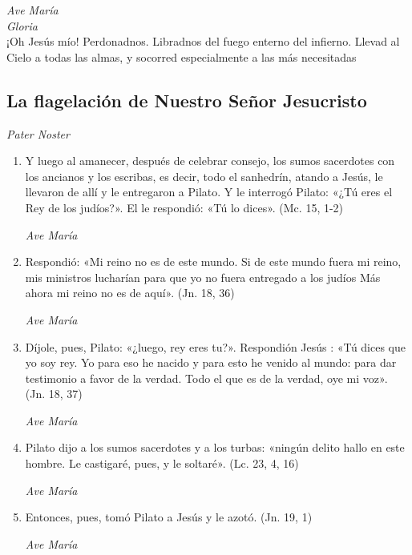 \documentclass[a4paper,11pt, oneside]{report}
\begin{document}
      \textit{Ave María} \\
      \indent\textit{Gloria} \\
      \indent¡Oh Jesús mío! Perdonadnos. Libradnos del fuego enterno del infierno. Llevad al Cielo a todas las almas, y socorred especialmente a las más 
      necesitadas

    \subsection*{ La flagelación de Nuestro Señor Jesucristo }
      
      \textit{Pater Noster}

      \begin{enumerate}
        
        \item Y luego al amanecer, después de celebrar consejo, los sumos sacerdotes con los ancianos y los escribas, es decir, todo el sanhedrín, atando a Jesús,
        le llevaron de allí y le entregaron a Pilato. Y le interrogó Pilato: «¿Tú eres el Rey de los judíos?». El le respondió: «Tú lo dices». (Mc. 15, 1-2)

        \textit{Ave María}

        \item Respondió: «Mi reino no es de este mundo. Si de este mundo fuera mi reino, mis ministros lucharían para que yo no fuera entregado a los judíos
        Más ahora mi reino no es de aquí». (Jn. 18, 36)

        \textit{Ave María}

        \item Díjole, pues, Pilato: «¿luego, rey eres tu?». Respondión Jesús : «Tú dices que yo soy rey. Yo para eso he nacido y para esto he venido
        al mundo: para dar testimonio a favor de la verdad. Todo el que es de la verdad, oye mi voz». (Jn. 18, 37)

        \textit{Ave María}

        \item Pilato dijo a los sumos sacerdotes y a los turbas: «ningún delito hallo en este hombre. 
        Le castigaré, pues, y le soltaré». (Lc. 23, 4, 16)

        \textit{Ave María}

        \item Entonces, pues, tomó Pilato a Jesús y le azotó. (Jn. 19, 1)

        \textit{Ave María}


\end{enumerate}
\end{document}
